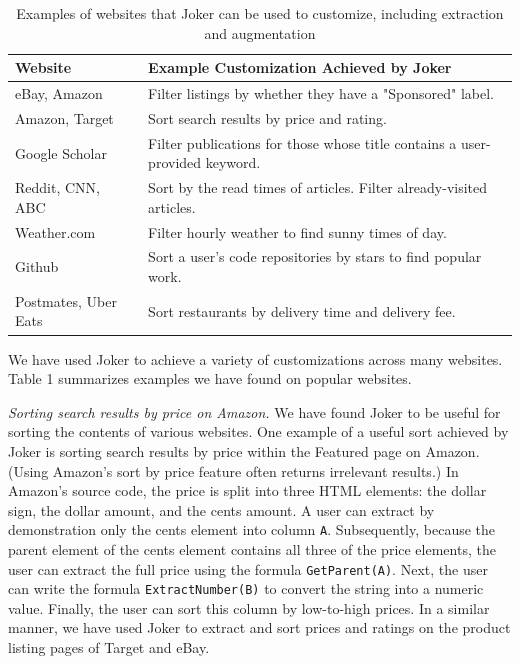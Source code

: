 \documentclass[conference]{IEEEtran}
\begin{document}
\begin{table}[]
\centering
\begin{tabular}{|l|l|}
\hline
\textbf{Website}              & \textbf{Example Customization Achieved by Joker}                                        \\ \hline
eBay, Amazon            & Filter listings by whether they have a "Sponsored" label.                        \\
Amazon, Target & Sort search results by price and rating.                                                \\
Google Scholar                & Filter publications for those whose title contains a user-provided keyword. \\
Reddit, CNN, ABC  & Sort by the read times of articles. Filter already-visited articles.         \\
Weather.com                   & Filter hourly weather to find sunny times of day.                                        \\
Github                        & Sort a user's code repositories by stars to find popular work.                          \\
Postmates, Uber Eats    & Sort restaurants by delivery time and delivery fee.                                     \\ \hline
\end{tabular}
\vspace{8pt}
\caption{Examples of websites that Joker can be used to customize, including extraction and augmentation}
\end{table}

We have used Joker to achieve a variety of customizations across many
websites. Table 1 summarizes examples we have found on popular websites.

\emph{Sorting search results by price on Amazon.} We have found Joker to
be useful for sorting the contents of various websites. One example of a
useful sort achieved by Joker is sorting search results by price within
the Featured page on Amazon. (Using Amazon's sort by price feature often
returns irrelevant results.) In Amazon's source code, the price is split
into three HTML elements: the dollar sign, the dollar amount, and the
cents amount. A user can extract by demonstration only the cents element
into column \texttt{A}. Subsequently, because the parent element of the
cents element contains all three of the price elements, the user can
extract the full price using the formula \texttt{GetParent(A)}. Next,
the user can write the formula \texttt{ExtractNumber(B)} to convert the
string into a numeric value. Finally, the user can sort this column by
low-to-high prices. In a similar manner, we have used Joker to extract
and sort prices and ratings on the product listing pages of Target and
eBay.
\end{document}
